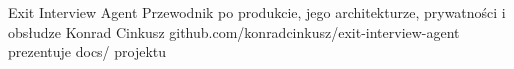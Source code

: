 \documentclass[11pt,a4paper]{article}
\begin{document}
\housetitle
  {Exit Interview Agent}
  {Przewodnik po produkcie, jego architekturze, prywatności i obsłudze}
  {Konrad Cinkusz}
  {github.com/konradcinkusz/exit-interview-agent}
  {prezentuje docs/ projektu}

\tableofcontents
\newpage







\end{document}
